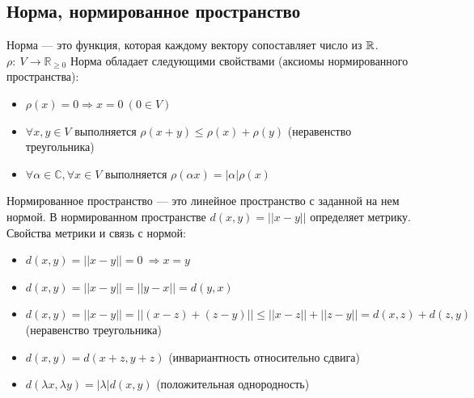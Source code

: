 \subsection{Норма, нормированное пространство}
    \begin{definition}
        Норма --- это функция, которая каждому вектору сопоставляет число из $\operatorname*{\mathbb{R}}$.
        \newline
        $\rho: \ V \rightarrow \mathbb{R}_{\geq 0}$
        \newline
        Норма обладает следующими свойствами (аксиомы нормированного пространства):
        \begin{itemize}
            \item 
            $\rho(x) = 0 \Rightarrow x = 0 \ (0 \in V)$
            \item
            $\forall x, y \in V$ выполняется $\rho(x + y) \leq \rho(x) + \rho(y)$ (неравенство треугольника)
            \item
            $\forall \alpha \in \mathbb{C}, \forall x \in V$ выполняется $\rho(\alpha x) = |\alpha| \rho(x)$
        \end{itemize}
    \end{definition}
    \begin{definition}
        Нормированное пространство --- это линейное пространство с заданной на нем нормой.
        \newline
        В нормированном пространстве $d(x, y) = ||x - y||$ определяет метрику.
        \newline
        Свойства метрики и связь с нормой:
        \begin{itemize}
            \item 
            $d(x, y) = ||x - y|| = 0 \ \Rightarrow x = y$
            \item
            $d(x, y) = ||x - y|| = ||y - x|| = d(y, x)$
            \item
            $d(x, y) = ||x - y|| = ||(x - z) + (z - y)|| \leq ||x - z|| + ||z - y|| = d(x, z) + d(z, y)$ (неравенство треугольника)
            \item
            $d(x, y) = d(x + z, y + z)$ (инвариантность относительно сдвига)
            \item
            $d(\lambda x, \lambda y) = |\lambda|d(x, y)$ (положительная однородность)
        \end{itemize}
    \end{definition}

